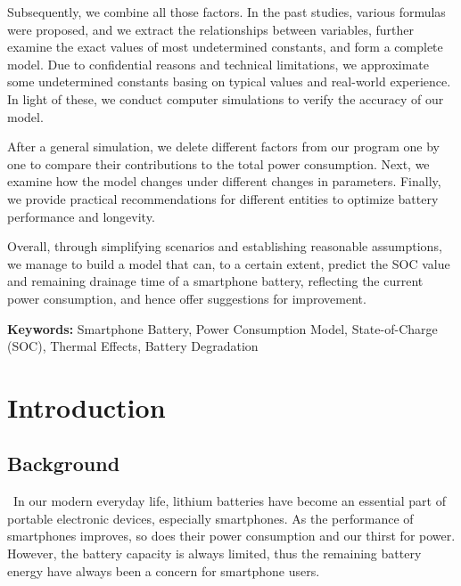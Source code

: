 \documentclass[12pt]{article}
\begin{document}
Subsequently, we combine all those factors. In the past studies, various formulas were proposed, and we extract the relationships between variables, further examine the exact values of most undetermined constants, and form a complete model. Due to confidential reasons and technical limitations, we approximate some undetermined constants basing on typical values and real-world experience. In light of these, we conduct computer simulations to verify the accuracy of our model. 

After a general simulation, we delete different factors from our program one by one to compare their contributions to the total power consumption. Next, we examine how the model changes under different changes in parameters. Finally, we provide practical recommendations for different entities to optimize battery performance and longevity.

Overall, through simplifying scenarios and establishing reasonable assumptions, we manage to build a model that can, to a certain extent, predict the SOC value and remaining drainage time of a smartphone battery, reflecting the current power consumption, and hence offer suggestions for improvement.

\textbf{Keywords:} Smartphone Battery, Power Consumption Model, State-of-Charge (SOC), Thermal Effects, Battery Degradation


\clearpage
\pagestyle{fancy}
\newpage
\setcounter{page}{1}

\tableofcontents 
\newpage

\section{Introduction}

\subsection{Background}

\quad\, In our modern everyday life, lithium batteries have become an essential part of portable electronic devices, especially smartphones. As the performance of smartphones improves, so does their power consumption and our thirst for power. However, the battery capacity is always limited, thus the remaining battery energy have always been a concern for smartphone users.
\end{document}
